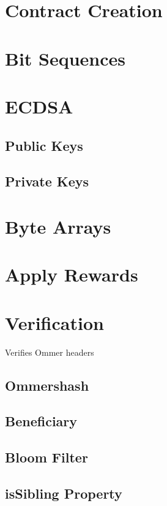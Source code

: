 \documentclass[11pt,a4paper,leqno,bibliography=totoc]{scrartcl}
\newenvironment{alphafootnotes}
{\par\edef\savedfootnotenumber{\number\value{footnote}}
\renewcommand{\thefootnote}{\alph{footnote}}
\setcounter{footnote}{0}}
{\par\setcounter{footnote}{\savedfootnotenumber}}
\begin{document}
\begin{alphafootnotes}
\begin{multicols*}{2}
\section{Contract Creation}

\section{Bit Sequences}
\columnbreak


\section{ECDSA}
\subsection{Public Keys}
\subsection{Private Keys}

\section{Byte Arrays}


    \section{Apply Rewards}

    \section{Verification}
    Verifies Ommer headers

    \subsection{Ommershash}

    \subsection{Beneficiary}

    \subsection{Bloom Filter}

    \subsection{isSibling Property}


\end{multicols*}
\end{alphafootnotes}
\end{document}
